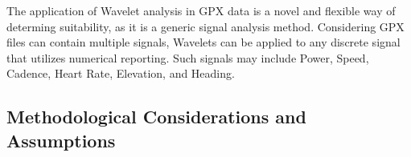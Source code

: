 \documentclass[12pt,a4paper]{article}
\begin{document}
The application of Wavelet analysis in GPX data is a novel and flexible way of determing suitability, as it is a generic signal analysis method. Considering GPX files can
contain multiple signals, Wavelets can be applied to any discrete signal that utilizes numerical reporting. Such signals may include Power, Speed, Cadence, Heart Rate, Elevation, and Heading.


\subsection{Methodological Considerations and Assumptions}
\end{document}
